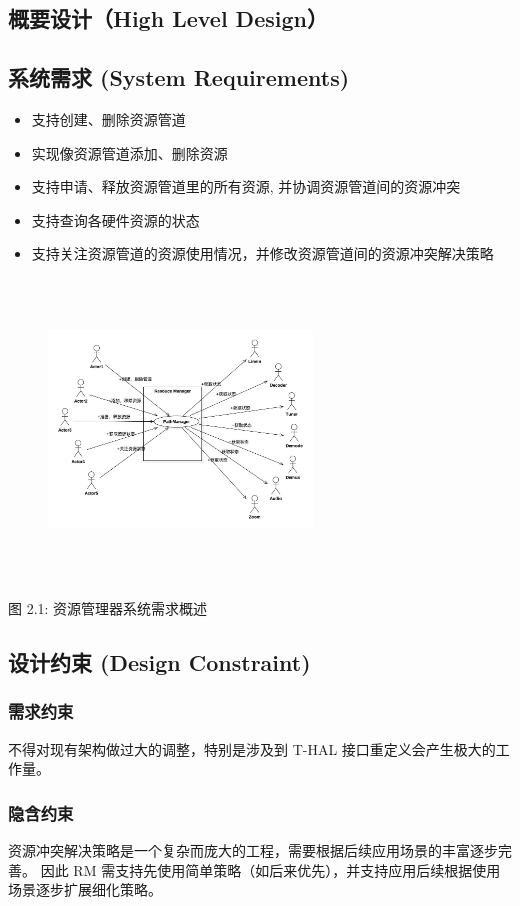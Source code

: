 \documentclass[10pt,a4paper,titlepage]{article} %
\begin{document}
\begin{flushleft}
	\section{概要设计（High Level Design）}
		\subsection{系统需求 (System Requirements)}
			\begin{itemize}
        		\item 支持创建、删除资源管道
        		\item 实现像资源管道添加、删除资源
        		\item 支持申请、释放资源管道里的所有资源, 并协调资源管道间的资源冲突
        		\item 支持查询各硬件资源的状态
        		\item 支持关注资源管道的资源使用情况，并修改资源管道间的资源冲突解决策略
     		\end {itemize}
			\begin{figure}[h]
				\centering
				\includegraphics[width=7cm,height=8cm]{2.1}
			\end{figure}
\centerline{{图 2.1: 资源管理器系统需求概述}}
         \subsection{设计约束 (Design Constraint)}
         \subsubsection{需求约束}
         不得对现有架构做过大的调整，特别是涉及到 T-HAL 接口重定义会产生极大的工作量。
         \subsubsection{隐含约束}
         资源冲突解决策略是一个复杂而庞大的工程，需要根据后续应用场景的丰富逐步完善。
		 因此 RM 需支持先使用简单策略（如后来优先），并支持应用后续根据使用场景逐步扩展细化策略。
		\newpage
	\end{flushleft}
\end{document}
